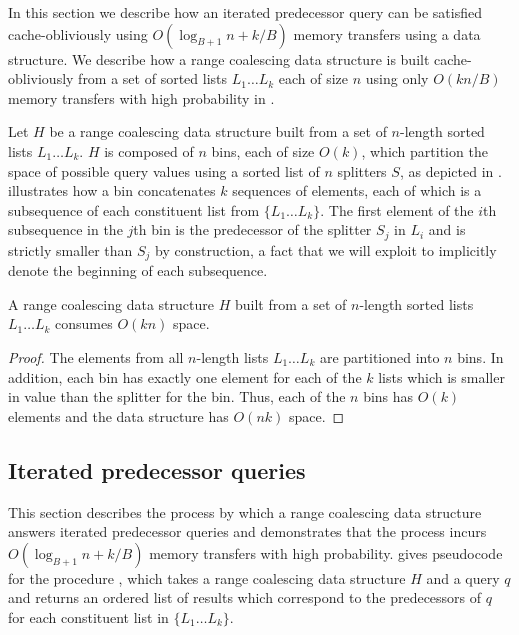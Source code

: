 
In this section we describe how an iterated predecessor query can be 
satisfied cache-obliviously using $O(\log_{B+1} n + k/B)$ 
memory transfers using a  data structure.  
We describe how a range coalescing data structure is built 
cache-obliviously from a set of sorted lists $L_1 \ldots L_k$ each of size $n$ 
using only $O(kn/B)$ memory transfers with high probability in .  


Let $H$ be a range coalescing data structure built from a set of $n$-length
sorted lists $L_1 \ldots L_k$.  $H$ is composed of $n$ bins, each of size $O(k)$,
which partition the space of possible query values using a sorted list of $n$ 
splitters $S$, as depicted in .  
illustrates how a bin concatenates $k$ sequences of elements, each of which is a 
subsequence of each constituent list from $\{L_1 \ldots L_k\}$.  
The first element of the $i$th subsequence in the $j$th bin is the predecessor
of the splitter $S_j$ in $L_i$ and is strictly smaller than $S_j$ by construction, 
a fact that we will exploit to implicitly denote the beginning of each subsequence.  

\begin{lemma}
A range coalescing data structure $H$ built from a set of $n$-length
sorted lists $L_1 \ldots L_k$ consumes $O(kn)$ space.
\end{lemma}
\begin{proof}
The elements from all $n$-length lists $L_1 \ldots L_k$ are partitioned 
into $n$ bins.  In addition, each bin has exactly one element for each of 
the $k$ lists which is smaller in value than the splitter for the bin.  Thus, each
of the $n$ bins has $O(k)$ elements and the data structure has $O(nk)$ space.
\end{proof}


\subsection*{Iterated predecessor queries}

This section describes the process by which a range coalescing data structure
answers iterated predecessor queries and demonstrates that the process incurs
$O(\log_{B+1} n + k/B)$ memory transfers with high probability.  
gives pseudocode for the procedure , which takes a range
coalescing data structure $H$ and a query $q$ and returns an ordered list of results which
correspond to the predecessors of $q$ for each constituent list in $\{ L_1 \ldots L_k \}$.

